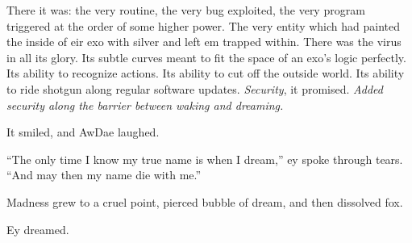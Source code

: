 There it was: the very routine, the very bug exploited, the very program triggered at the order of some higher power. The very entity which had painted the inside of eir exo with silver and left em trapped within. There was the virus in all its glory. Its subtle curves meant to fit the space of an exo's logic perfectly. Its ability to recognize actions. Its ability to cut off the outside world. Its ability to ride shotgun along regular software updates. \emph{Security}, it promised. \emph{Added security along the barrier between waking and dreaming.}

It smiled, and AwDae laughed.

``The only time I know my true name is when I dream,'' ey spoke through tears. ``And may then my name die with me.''

Madness grew to a cruel point, pierced bubble of dream, and then dissolved fox.

Ey dreamed.

